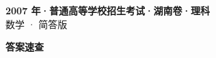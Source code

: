 \documentclass[zihao=-4, a4paper]{ctexart}
\begin{document}
\begin{center}
  {\Large\bfseries 2007 年·普通高等学校招生考试·湖南卷·理科}\\[4pt]
  {\large 数学 · 简答版}
\end{center}
\medskip
{}

\clearpage
{}
\begin{center}{\Large\bfseries 答案速查}\end{center}
\medskip

\end{document}
